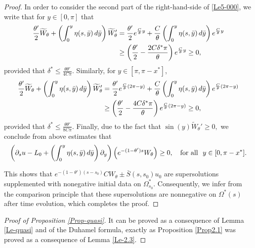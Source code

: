 \documentclass[12pt]{amsart}
\numberwithin{equation}{section}
\numberwithin{equation}{section}
\begin{document}
\begin{proof}
In order to consider the second part of the right-hand-side of \eqref{Le5-000}, we write that for $y\in[0, \pi]$ that
\begin{align}
 \frac{\theta'}{2} \widetilde{W}_\theta  + \left(\int_{0}^y \eta(s,\bar y) \,d\bar y\right)  \widetilde{W}_{\theta}'&= \frac{\theta'}{2} e^{\frac{C}{\theta} y}+ \frac{C}{\theta}  \left(\int_{0}^y \eta(s,\bar y) \,d\bar y\right) e^{\frac{C}{\theta} y}\notag\\
 &\geq \left( \frac{\theta'}{2}-\frac{2C\delta^*\pi}{\theta}\right)e^{\frac{C}{\theta} y}\geq 0,
\end{align}
provided that $\delta^* \leq \frac{\theta \theta'}{4C\pi}.$
   Similarly,  for $y\in[\pi, \pi-x^*]$,
 \begin{align}
 \frac{\theta'}{2} \widetilde{W}_\theta  + \left(\int_{0}^y \eta(s,\bar y) \,d\bar y\right)  \widetilde{W}_{\theta}'&= \frac{\theta'}{2} e^{\frac{C}{\theta} (2\pi-y)}+ \frac{C}{\theta}  \left(\int_{0}^y \eta(s,\bar y) \,d\bar y\right) e^{\frac{C}{\theta} (2\pi-y)}\notag\\
 &\geq \left( \frac{\theta'}{2}-\frac{4C\delta^*\pi}{\theta}\right)e^{\frac{C}{\theta} (2\pi-y)}\geq 0,
\end{align}
 provided that $\delta^* \leq \frac{\theta \theta'}{8C\pi}.$ 
 Finally,  due to the fact that $\sin(y)\widetilde{W}_{\theta}'\geq0,$ we conclude from above estimates that
 \begin{equation}
  \left(\partial_s u - L_0 + \left(\int_{0}^y \eta(s,\bar y) \,d\bar y\right) \partial_y \right) \left(e^{-(1-\theta')s}W_\theta \right) \geq 0, \quad {\rm for~ all}~~y\in[0, \pi-x^*].
 \end{equation}

This shows that  $e^{-(1-\theta')(s-s_0)}CW_\theta\pm \bar{S}(s, s_0)u_0$ are   supersolutions supplemented with nonegative initial data on $\Omega^*_{s_0}.$  Consequently,  we infer from  the comparison principle that these supersolutions are nonnegative on $\Omega^*(s)$ after time evolution,  which completes the proof.
  \end{proof}
 
 
 \begin{proof}[Proof of Proposition \ref{Prop-quasi}]
 
 It can be proved as a consequence of Lemma \ref{Le-quasi} and of the Duhamel formula, exactly as Proposition \ref{Prop2.1} was proved as a consequence of Lemma \ref{Le-2.3}.
 \end{proof}
 
 
 
\end{document}
